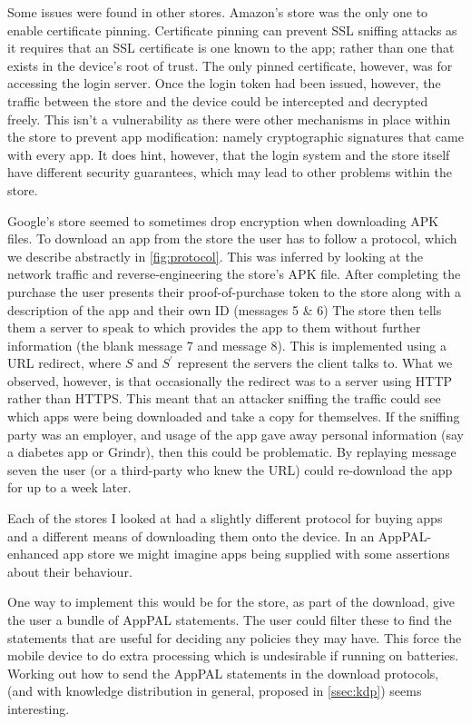 \documentclass[a4paper]{scrartcl}
\begin{document}
Some issues were found in other stores.
Amazon's store was the only one to enable certificate pinning.
Certificate pinning can prevent SSL sniffing attacks as it requires that an SSL certificate is one known to the app; rather than one that exists in the device's root of trust.
The only pinned certificate, however, was for accessing the login server.
Once the login token had been issued, however, the traffic between the store and the device could be intercepted and decrypted freely.
This isn't a vulnerability as there were other mechanisms in place within the store to prevent app modification: namely cryptographic signatures that came with every app.
It does hint, however, that the login system and the store itself have different security guarantees, which may lead to other problems within the store.

Google's store seemed to sometimes drop encryption when downloading APK files.
To download an app from the store the user has to follow a protocol, which we describe abstractly in \autoref{fig:protocol}.
This was inferred by looking at the network traffic and reverse-engineering the store's APK file.
After completing the purchase the user presents their proof-of-purchase token to the store along with a description of the app and their own ID (messages 5 \& 6)
The store then tells them a server to speak to which provides the app to them without further information (the blank message 7 and message 8).
This is implemented using a URL redirect, where $S$ and $S^\prime$ represent the servers the client talks to.
What we observed, however, is that occasionally the redirect was to a server using HTTP rather than HTTPS.
This meant that an attacker sniffing the traffic could see which apps were being downloaded and take a copy for themselves.
If the sniffing party was an employer, and usage of the app gave away personal information (say a diabetes app or Grindr), then this could be problematic.
By replaying message seven the user (or a third-party who knew the URL) could re-download the app for up to a week later.

Each of the stores I looked at had a slightly different protocol for buying apps and a different means of downloading them onto the device.
In an AppPAL-enhanced app store we might imagine apps being supplied with some assertions about their behaviour.

One way to implement this would be for the store, as part of the download, give the user a bundle of AppPAL statements.
The user could filter these to find the statements that are useful for deciding any policies they may have.
This force the mobile device to do extra processing which is undesirable if running on batteries.
Working out how to send the AppPAL statements in the download protocols, (and with knowledge distribution in general, proposed in \autoref{ssec:kdp}) seems interesting.
\end{document}
